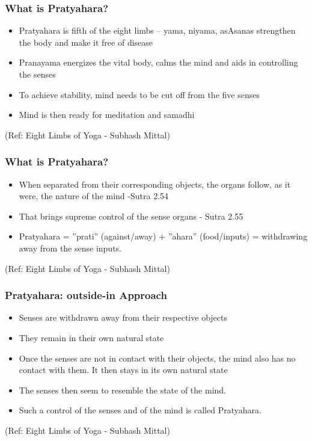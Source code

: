 \begin{frame}[fragile]\frametitle{What is Pratyahara?}


	\begin{itemize}
	\item Pratyahara is fifth of the eight limbs – yama, 
niyama, asAsanas strengthen the body and make it free 
of disease
	\item Pranayama energizes the vital body, calms the 
mind and aids in controlling the senses
	\item To achieve stability, mind needs to be cut off 
from the five senses
	\item  Mind is then ready for meditation and 
samadhi
	\end{itemize}

\tiny{(Ref: Eight Limbs of Yoga - Subhash Mittal)}

\end{frame}

\begin{frame}[fragile]\frametitle{What is Pratyahara?}


	\begin{itemize}
	\item  When separated from their corresponding 
objects, the organs follow, as it were, the nature 
of the mind -Sutra 2.54
	\item   That brings supreme control of the sense organs -
Sutra 2.55
	\item   Pratyahara = ''prati'' (against/away) + ''ahara'' 
(food/inputs)  = withdrawing away from the 
sense inputs.
	\end{itemize}

\tiny{(Ref: Eight Limbs of Yoga - Subhash Mittal)}

\end{frame}



\begin{frame}[fragile]\frametitle{Pratyahara: outside-in Approach}


	\begin{itemize}
	\item  Senses are withdrawn away from their respective 
objects
	\item   They remain in their own natural state
	\item   Once the senses are not in contact with their 
objects, the mind also has no contact with them. 
It then stays in its own natural state
	\item   The senses then seem to resemble the state of 
the mind. 
	\item   Such a control of the senses and of the mind is 
called Pratyahara.
	\end{itemize}

\tiny{(Ref: Eight Limbs of Yoga - Subhash Mittal)}

\end{frame}

